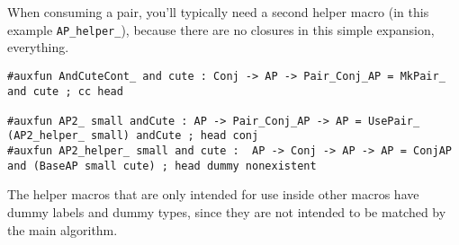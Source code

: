 When consuming a pair, you'll typically need a second helper macro (in this example \texttt{AP\_helper\_}), because there are no closures in this simple expansion, everything.
\begin{lstlisting}
#auxfun AndCuteCont_ and cute : Conj -> AP -> Pair_Conj_AP = MkPair_ and cute ; cc head

#auxfun AP2_ small andCute : AP -> Pair_Conj_AP -> AP = UsePair_ (AP2_helper_ small) andCute ; head conj
#auxfun AP2_helper_ small and cute :  AP -> Conj -> AP -> AP = ConjAP and (BaseAP small cute) ; head dummy nonexistent
\end{lstlisting}

The helper macros that are only intended for use inside other macros have dummy labels and dummy types, since they are not intended to be matched by the main algorithm.